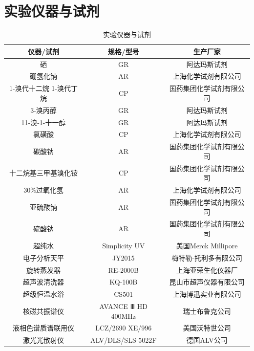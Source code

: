 \documentclass[bachelor,winfonts,replaceperiod]{jnuthesis}
\begin{document}
    \section{实验仪器与试剂}
        \begin{table}[htp]
        \centering
        \begin{tabular}{ccc}
            \toprule
            \textbf{仪器/试剂} & \textbf{规格/型号} & \textbf{生产厂家} \\
            \midrule
            硒   & GR & 阿达玛斯试剂 \\
            硼氢化钠  & AR  & 上海化学试剂有限公司 \\
            1-溴代十二烷
            1-溴代丁烷  & CP & 国药集团化学试剂有限公司 \\
            3-溴丙醇 & GR & 阿达玛斯试剂 \\
            11-溴-1-十一醇 & GR & 阿达玛斯试剂 \\
            氯磺酸  & CP & 上海化学试剂有限公司 \\
            碳酸钠  & AR & 国药集团化学试剂有限公司 \\
            十二烷基三甲基溴化铵 & CP & 国药集团化学试剂有限公司\\
            30\%过氧化氢  & AR & 上海化学试剂有限公司 \\
            亚硫酸钠  & AR & 国药集团化学试剂有限公司 \\
            硫酸钠  & AR & 国药集团化学试剂有限公司 \\
            超纯水 & Simplicity\ce{^{\textregistered}} UV & 美国Merck Millipore\\
            电子分析天平  & JY2015 & 梅特勒-托利多有限公司 \\
            旋转蒸发器  & RE-2000B & 上海亚荣生化仪器厂 \\
            超声波清洗器  & KQ-100B & 昆山市超声仪器有限公司 \\
            超级恒温水浴  & CS501 & 上海博迅实业有限公司 \\
            核磁共振谱仪  & AVANCE Ⅲ HD 400MHz & 瑞士布鲁克公司 \\
            液相色谱质谱联用仪  & LCZ/2690 XE/996 & 美国沃特世公司 \\
            激光光散射仪 & ALV/DLS/SLS-5022F & 德国ALV公司\\
            \bottomrule
        \end{tabular}
        \caption{实验仪器与试剂}\label{table:实验仪器与试剂}
    \end{table}
    
\end{document}
